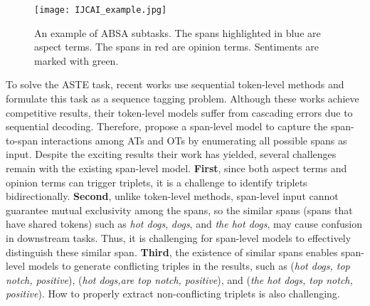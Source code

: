 \documentclass[11pt]{article}
\begin{document}
\begin{figure} [t]
	\centering
	\texttt{[image: IJCAI\_example.jpg]}
	\caption{An example of ABSA subtasks. The spans highlighted in blue are aspect terms. The spans in red are opinion terms. Sentiments are marked with green.}
	\label{example}
\end{figure}

To solve the ASTE task, recent works \cite{DBLP:conf/aaai/PengXBHLS20,DBLP:journals/corr/abs-2010-04640,DBLP:conf/aaai/MaoSYC21} use sequential token-level methods and formulate this task as a sequence tagging problem. Although these works achieve competitive results, their token-level models suffer from cascading errors due to sequential decoding. Therefore, \cite{DBLP:conf/acl/XuCB20} propose a span-level model to capture the span-to-span interactions among ATs and OTs by enumerating all possible spans as input. Despite the exciting results their work has yielded, several challenges remain with the existing span-level model. \textbf{First}, since both aspect terms and opinion terms can trigger triplets, it is a challenge to identify triplets bidirectionally. \textbf{Second}, unlike token-level methods, span-level input cannot guarantee mutual exclusivity among the spans, so the similar spans (spans that have shared tokens) such as \emph{hot dogs}, \emph{dogs}, and \emph{the hot dogs}, may cause confusion in downstream tasks. Thus, it is challenging for span-level models to effectively distinguish these similar span. \textbf{Third}, the existence of similar spans enables span-level models to generate conflicting triples in the results, such as (\emph{hot dogs, top notch, positive}), (\emph{hot dogs,are top notch, positive}), and (\emph{the hot dogs, top notch, positive}). How to properly extract non-conflicting triplets is also challenging.
\end{document}
